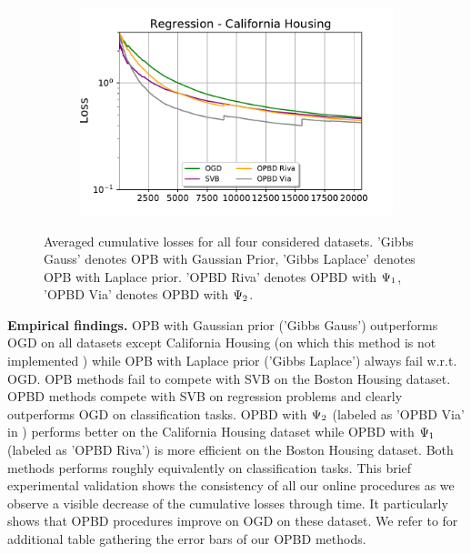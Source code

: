 \begin{figure}
\begin{subfigure}[b]{0.45\textwidth}
\end{subfigure}~
\begin{subfigure}[b]{0.45\textwidth}
  \centering
  \includegraphics[width=\textwidth]{chapter_3/figures/reg_california}
\end{subfigure}
\caption{Averaged cumulative losses for all four considered datasets. 'Gibbs Gauss' denotes OPB with Gaussian Prior, 'Gibbs Laplace' denotes OPB with Laplace prior. 'OPBD Riva' denotes OPBD with $\Psi_{\normalfont1}$, 'OPBD Via' denotes OPBD with $\Psi_{\normalfont2}$. }
\label{fig: exp_results}
 \end{figure}




\textbf{Empirical findings.} OPB with Gaussian prior ('Gibbs Gauss') outperforms OGD on all datasets except California Housing (on which this method is not implemented ) while OPB with Laplace prior ('Gibbs Laplace') always fail w.r.t. OGD. OPB methods fail to compete with SVB on the Boston Housing dataset. OPBD methods compete with SVB on regression problems and clearly outperforms OGD on classification tasks. OPBD with $\Psi_{\normalfont2}$ (labeled as 'OPBD Via' in ) performs better on the California Housing dataset while OPBD with $\Psi_{\normalfont1}$ (labeled as 'OPBD Riva') is more efficient on the Boston Housing dataset. Both methods performs roughly equivalently on classification tasks.  This brief experimental validation shows the consistency of all our online procedures as we observe a visible decrease of the cumulative losses through time. It particularly shows that OPBD procedures improve on OGD on these dataset. We refer to  for additional table gathering the error bars of our OPBD methods.

